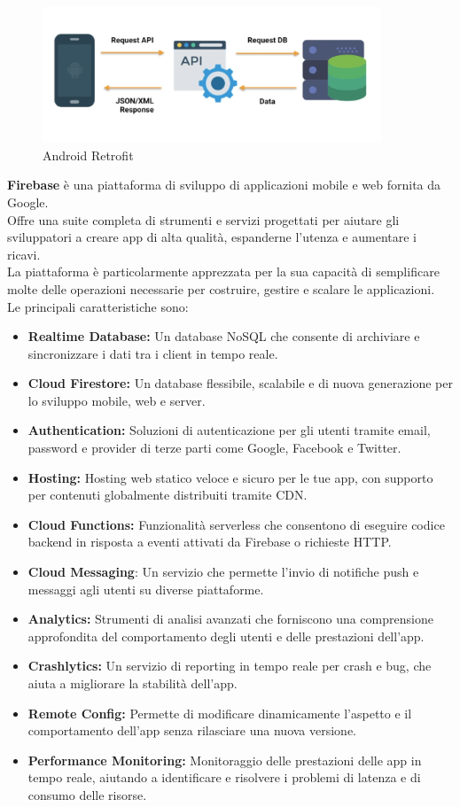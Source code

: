 \documentclass{article}
\begin{document}
		\begin{figure}[H]
			\centering
			\includegraphics[width=0.9\textwidth]{Immagini/retrofit}
			\caption{Android Retrofit}
		\end{figure}
		\textbf{Firebase} è una piattaforma di sviluppo di applicazioni mobile e web fornita da Google.\\
		Offre una suite completa di strumenti e servizi progettati per aiutare gli sviluppatori a creare app di alta qualità, espanderne l'utenza e aumentare i ricavi.\\
		La piattaforma è particolarmente apprezzata per la sua capacità di semplificare molte delle operazioni necessarie per costruire, gestire e scalare le applicazioni.\\
		Le principali caratteristiche sono:
		\begin{itemize}
			\item \textbf{Realtime Database:} Un database NoSQL che consente di archiviare e sincronizzare i dati tra i client in tempo reale.
			\item \textbf{Cloud Firestore:} Un database flessibile, scalabile e di nuova generazione per lo sviluppo mobile, web e server.
			\item \textbf{Authentication:} Soluzioni di autenticazione per gli utenti tramite email, password e provider di terze parti come Google, Facebook e Twitter.
			\item \textbf{Hosting:} Hosting web statico veloce e sicuro per le tue app, con supporto per contenuti globalmente distribuiti tramite CDN.
			\item \textbf{Cloud Functions:} Funzionalità serverless che consentono di eseguire codice backend in risposta a eventi attivati da Firebase o richieste HTTP.
			\item \textbf{Cloud Messaging}: Un servizio che permette l'invio di notifiche push e messaggi agli utenti su diverse piattaforme.
			\item \textbf{Analytics:} Strumenti di analisi avanzati che forniscono una comprensione approfondita del comportamento degli utenti e delle prestazioni dell'app.
			\item \textbf{Crashlytics:} Un servizio di reporting in tempo reale per crash e bug, che aiuta a migliorare la stabilità dell'app.
			\item \textbf{Remote Config:} Permette di modificare dinamicamente l'aspetto e il comportamento dell'app senza rilasciare una nuova versione.
			\item \textbf{Performance Monitoring:} Monitoraggio delle prestazioni delle app in tempo reale, aiutando a identificare e risolvere i problemi di latenza e di consumo delle risorse.
		\end{itemize}
\end{document}
